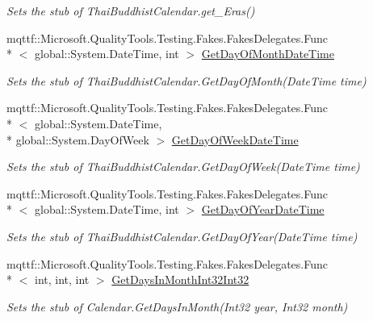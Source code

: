 \begin{DoxyCompactItemize}
\begin{DoxyCompactList}\small\item\em Sets the stub of Thai\-Buddhist\-Calendar.\-get\-\_\-\-Eras()\end{DoxyCompactList}\item 
mqttf\-::\-Microsoft.\-Quality\-Tools.\-Testing.\-Fakes.\-Fakes\-Delegates.\-Func\\*
$<$ global\-::\-System.\-Date\-Time, int $>$ \hyperlink{class_system_1_1_globalization_1_1_fakes_1_1_stub_thai_buddhist_calendar_a67fad3bb8aff7f496a82ef05b2d9b337}{Get\-Day\-Of\-Month\-Date\-Time}
\begin{DoxyCompactList}\small\item\em Sets the stub of Thai\-Buddhist\-Calendar.\-Get\-Day\-Of\-Month(\-Date\-Time time)\end{DoxyCompactList}\item 
mqttf\-::\-Microsoft.\-Quality\-Tools.\-Testing.\-Fakes.\-Fakes\-Delegates.\-Func\\*
$<$ global\-::\-System.\-Date\-Time, \\*
global\-::\-System.\-Day\-Of\-Week $>$ \hyperlink{class_system_1_1_globalization_1_1_fakes_1_1_stub_thai_buddhist_calendar_a1f4f046848165509b6b4c45e487a8f4a}{Get\-Day\-Of\-Week\-Date\-Time}
\begin{DoxyCompactList}\small\item\em Sets the stub of Thai\-Buddhist\-Calendar.\-Get\-Day\-Of\-Week(\-Date\-Time time)\end{DoxyCompactList}\item 
mqttf\-::\-Microsoft.\-Quality\-Tools.\-Testing.\-Fakes.\-Fakes\-Delegates.\-Func\\*
$<$ global\-::\-System.\-Date\-Time, int $>$ \hyperlink{class_system_1_1_globalization_1_1_fakes_1_1_stub_thai_buddhist_calendar_ac289731b794a71365e24401424e0550c}{Get\-Day\-Of\-Year\-Date\-Time}
\begin{DoxyCompactList}\small\item\em Sets the stub of Thai\-Buddhist\-Calendar.\-Get\-Day\-Of\-Year(\-Date\-Time time)\end{DoxyCompactList}\item 
mqttf\-::\-Microsoft.\-Quality\-Tools.\-Testing.\-Fakes.\-Fakes\-Delegates.\-Func\\*
$<$ int, int, int $>$ \hyperlink{class_system_1_1_globalization_1_1_fakes_1_1_stub_thai_buddhist_calendar_a08e00baeb535fde6b78f1d0e6bdc2263}{Get\-Days\-In\-Month\-Int32\-Int32}
\begin{DoxyCompactList}\small\item\em Sets the stub of Calendar.\-Get\-Days\-In\-Month(\-Int32 year, Int32 month)\end{DoxyCompactList}\item 

\end{DoxyCompactItemize}
